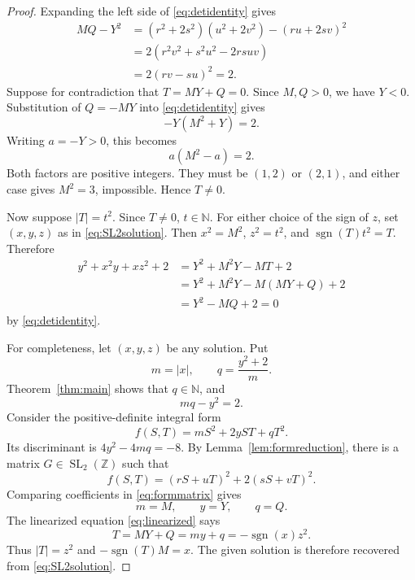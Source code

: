 \documentclass[11pt,a4paper]{amsart}
\numberwithin{equation}{section}
\theoremstyle{definition}
\DeclareMathOperator{\sgn}{sgn}
\newcommand{\Z}{\mathbb Z}
\newcommand{\N}{\mathbb N}
\newcommand{\SL}{\operatorname{SL}}
\begin{document}
\begin{proof}
Expanding the left side of \eqref{eq:detidentity} gives
\begin{align*}
 MQ-Y^2
 &=(r^2+2s^2)(u^2+2v^2)-(ru+2sv)^2\\
 &=2(r^2v^2+s^2u^2-2rsuv)\\
 &=2(rv-su)^2=2.
\end{align*}
Suppose for contradiction that \(T=MY+Q=0\).  Since \(M,Q>0\), we
have \(Y<0\).  Substitution of \(Q=-MY\) into
\eqref{eq:detidentity} gives
\begin{equation*}
 -Y(M^2+Y)=2.
\end{equation*}
Writing \(a=-Y>0\), this becomes
\begin{equation*}
 a(M^2-a)=2.
\end{equation*}
Both factors are positive integers.  They must be \((1,2)\) or
\((2,1)\), and either case gives \(M^2=3\), impossible.  Hence
\(T\ne0\).

Now suppose \(|T|=t^2\).  Since \(T\ne0\), \(t\in\N\).  For either
choice of the sign of \(z\), set \((x,y,z)\) as in
\eqref{eq:SL2solution}.  Then \(x^2=M^2\), \(z^2=t^2\), and
\(\sgn(T)t^2=T\).  Therefore
\begin{align*}
 y^2+x^2y+xz^2+2
 &=Y^2+M^2Y-MT+2\\
 &=Y^2+M^2Y-M(MY+Q)+2\\
 &=Y^2-MQ+2=0
\end{align*}
by \eqref{eq:detidentity}.

For completeness, let \((x,y,z)\) be any solution.  Put
\begin{equation*}
 m=|x|,
 \qquad q=\frac{y^2+2}{m}.
\end{equation*}
Theorem~\ref{thm:main} shows that \(q\in\N\), and
\begin{equation}
 mq-y^2=2.
 \label{eq:mqidentity}
\end{equation}
Consider the positive-definite integral form
\begin{equation}
 f(S,T)=mS^2+2yST+qT^2.
 \label{eq:solutionform}
\end{equation}
Its discriminant is \(4y^2-4mq=-8\).  By
Lemma~\ref{lem:formreduction}, there is a matrix
\(G\in\SL_2(\Z)\) such that
\begin{equation}
 f(S,T)=(rS+uT)^2+2(sS+vT)^2.
 \label{eq:formmatrix}
\end{equation}
Comparing coefficients in \eqref{eq:formmatrix} gives
\begin{equation*}
 m=M,
 \qquad y=Y,
 \qquad q=Q.
\end{equation*}
The linearized equation \eqref{eq:linearized} says
\begin{equation*}
 T=MY+Q=my+q=-\sgn(x)z^2.
\end{equation*}
Thus \(|T|=z^2\) and
\(-\sgn(T)M=x\).  The given solution is therefore recovered from
\eqref{eq:SL2solution}.
\end{proof}
\end{document}
